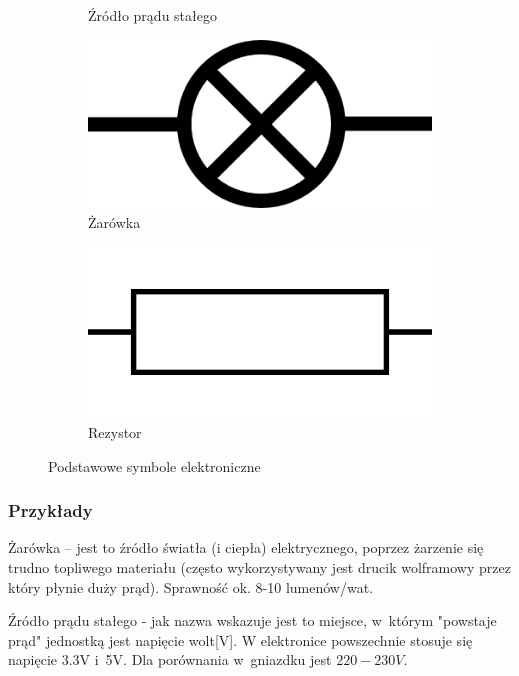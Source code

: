 \documentclass[a4paper,12pt, twoside]{article}
\begin{document}
\begin{figure}
\begin{subfigure}[h]{0.25\textwidth}
      \caption{Źródło prądu stałego}
			\label{fig:DC}
   \end{subfigure}
	\begin{subfigure}[h]{0.25\textwidth}
      \centering
      \includegraphics[scale=0.2]{LightBulb.png}
      \caption{Żarówka}
			\label{fig:zar}
   \end{subfigure}
	\begin{subfigure}[h]{0.25\textwidth}
      \centering
      \includegraphics[scale=0.05]{Resistor-Europe.png}
      \caption{Rezystor}
			\label{fig:rezystor}
   \end{subfigure}
	\caption{Podstawowe symbole elektroniczne}
	\label{fig:symbole}
\end{figure}
\FloatBarrier
   \subsubsection{Przykłady }
	
Żarówka -- jest to źródło światła (i ciepła) elektrycznego, poprzez żarzenie się trudno topliwego materiału (często wykorzystywany jest drucik wolframowy przez który płynie duży prąd). Sprawność ok.
8-10 lumenów/wat. 

Źródło prądu stałego - jak nazwa wskazuje jest to miejsce, w~którym "powstaje prąd" jednostką jest napięcie wolt[V]. W elektronice powszechnie stosuje się napięcie 3.3V i~5V. Dla porównania w~gniazdku jest $220-230V$.
\end{document}
